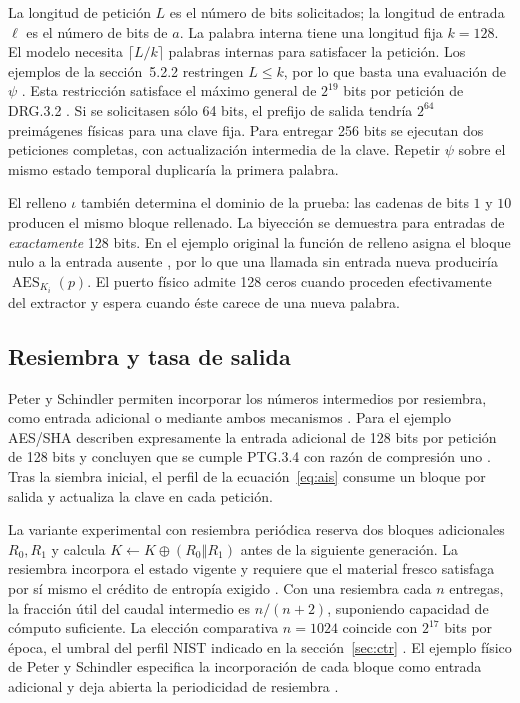 \documentclass[11pt,a4paper]{article}
\newcommand{\Enc}{\operatorname{AES}}
\newcommand{\cat}{\mathbin\Vert}
\begin{document}
La longitud de petición \(L\) es el número de bits solicitados; la longitud de entrada \(\ell\) es el número de bits de \(a\). La palabra interna tiene una longitud fija \(k=128\). El modelo necesita \(\lceil L/k\rceil\) palabras internas para satisfacer la petición. Los ejemplos de la sección~5.2.2 restringen \(L\le k\), por lo que basta una evaluación de \(\psi\) \cite[párrs.~131, 976 y 996]{ais}. Esta restricción satisface el máximo general de \(2^{19}\) bits por petición de DRG.3.2 \cite[párr.~207]{ais}. Si se solicitasen sólo 64 bits, el prefijo de salida tendría \(2^{64}\) preimágenes físicas para una clave fija. Para entregar 256 bits se ejecutan dos peticiones completas, con actualización intermedia de la clave. Repetir \(\psi\) sobre el mismo estado temporal duplicaría la primera palabra.

El relleno \(\iota\) también determina el dominio de la prueba: las cadenas de bits \(1\) y \(10\) producen el mismo bloque rellenado. La biyección se demuestra para entradas de \emph{exactamente} 128 bits. En el ejemplo original la función de relleno asigna el bloque nulo a la entrada ausente \cite[párr.~996]{ais}, por lo que una llamada sin entrada nueva produciría \(\Enc_{K_i}(p)\). El puerto físico admite 128 ceros cuando proceden efectivamente del extractor y espera cuando éste carece de una nueva palabra.

\subsection{Resiembra y tasa de salida}
Peter y Schindler permiten incorporar los números intermedios por resiembra, como entrada adicional o mediante ambos mecanismos \cite[párr.~384, p.~76]{ais}. Para el ejemplo AES/SHA describen expresamente la entrada adicional de 128 bits por petición de 128 bits y concluyen que se cumple PTG.3.4 con razón de compresión uno \cite[párr.~390(iii), p.~78]{ais}. Tras la siembra inicial, el perfil de la ecuación~\eqref{eq:ais} consume un bloque por salida y actualiza la clave en cada petición.

La variante experimental con resiembra periódica reserva dos bloques adicionales \(R_0,R_1\) y calcula \(K\gets K\oplus(R_0\cat R_1)\) antes de la siguiente generación. La resiembra incorpora el estado vigente y requiere que el material fresco satisfaga por sí mismo el crédito de entropía exigido \cite[párr.~148, p.~26]{ais}. Con una resiembra cada \(n\) entregas, la fracción útil del caudal intermedio es \(n/(n+2)\), suponiendo capacidad de cómputo suficiente. La elección comparativa \(n=1024\) coincide con \(2^{17}\) bits por época, el umbral del perfil NIST indicado en la sección~\ref{sec:ctr} \cite[§5.3(6)]{nist90c}. El ejemplo físico de Peter y Schindler especifica la incorporación de cada bloque como entrada adicional y deja abierta la periodicidad de resiembra \cite[párr.~390(iii)]{ais}.
\end{document}
